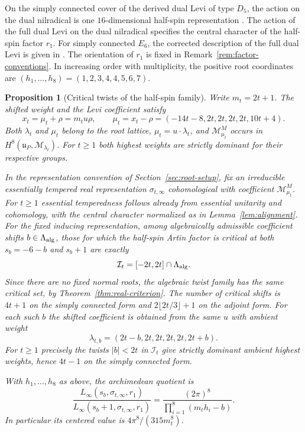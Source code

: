 \documentclass[12pt]{amsart}
\numberwithin{equation}{section}
\theoremstyle{plain}
\newtheorem{proposition}[theorem]{Proposition}
\theoremstyle{definition}
\theoremstyle{remark}
\newcommand{\cM}{\mathcal M}
\begin{document}
On the simply connected cover of the derived dual Levi of type $D_5$, the action on the dual nilradical is one $16$-dimensional half-spin representation \cite[\S2.5.4]{Kim2005}. The action of the full dual Levi on the dual nilradical specifies the central character of the half-spin factor $r_1$. For simply connected $E_6$, the corrected description of the full dual Levi is given in \cite[\S5, p.~293]{KimKim2011}. The orientation of $r_1$ is fixed in Remark~\ref{rem:factor-conventions}. In increasing order with multiplicity, the positive root coordinates are $(h_1,\ldots,h_8)=(1,2,3,4,4,5,6,7)$.

\begin{proposition}[Critical twists of the half-spin family]\label{prop:E6-regular-family}
Write $m_t=2t+1$. The shifted weight and the Levi coefficient satisfy
\[
 x_t=\mu_t+\rho=m_t u\rho,\qquad
 \mu_t=x_t-\rho=(-14t-8,2t,2t,2t,2t,10t+4).
\]
Both $\lambda_t$ and $\mu_t$ belong to the root lattice, $\mu_t=u\cdot\lambda_t$, and $\cM_{\mu_t}^M$ occurs in $H^8(\mathfrak u_P,\cM_{\lambda_t})$. For $t\ge1$ both highest weights are strictly dominant for their respective groups.

In the representation convention of Section~\ref{sec:root-setup}, fix an irreducible essentially tempered real representation $\sigma_{t,\infty}$ cohomological with coefficient $\cM_{\mu_t}^M$. For $t\ge1$ essential temperedness follows already from essential unitarity and cohomology, with the central character normalized as in Lemma~\ref{lem:alignment}. For the fixed inducing representation, among algebraically admissible coefficient shifts $b\in\Lambda_{\rm alg}$, those for which the half-spin Artin factor is critical at both $s_b=-6-b$ and $s_b+1$ are exactly
\[
 \mathcal I_t=[-2t,2t]\cap\Lambda_{\rm alg}.
\]
Since there are no fixed normal roots, the algebraic twist family has the same critical set, by Theorem~\ref{thm:real-criterion}. The number of critical shifts is $4t+1$ on the simply connected form and $2\lfloor 2t/3\rfloor+1$ on the adjoint form. For each such $b$ the shifted coefficient is obtained from the same $u$ with ambient weight
\[
 \lambda_{t,b}=(2t-b,2t,2t,2t,2t,2t+b).
\]
For $t\ge1$ precisely the twists $|b|<2t$ in $\mathcal I_t$ give strictly dominant ambient highest weights, hence $4t-1$ on the simply connected form.

With $h_1,\ldots,h_8$ as above, the archimedean quotient is
\begin{equation}\label{eq:E6-regular-ratio}
 \frac{L_\infty(s_b,\sigma_{t,\infty},r_1)}{L_\infty(s_b+1,\sigma_{t,\infty},r_1)}
 =\frac{(2\pi)^8}{\prod_{i=1}^8(m_th_i-b)}.
\end{equation}
In particular its centered value is $4\pi^8/(315m_t^8)$.
\end{proposition}
\end{document}
